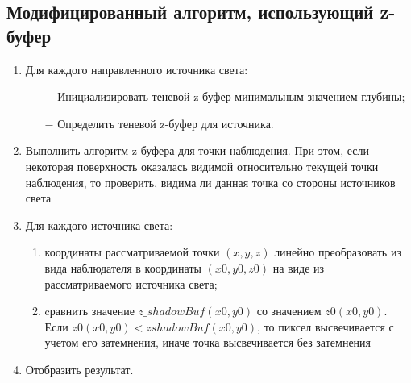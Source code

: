 \subsection{Модифицированный алгоритм, использующий z-буфер}
\begin{enumerate}
    \item Для каждого направленного источника света:
    \begin{enumerate}
        \item[$-$] Инициализировать теневой z-буфер минимальным значением глубины;
        \item[$-$] Определить теневой z-буфер для источника.
    \end{enumerate}
    \item Выполнить алгоритм z-буфера для точки наблюдения. При этом, если
    некоторая поверхность оказалась видимой относительно текущей точки
    наблюдения, то проверить, видима ли данная точка со стороны источников света
    \item Для каждого источника света:
    \begin{enumerate}
        \item координаты рассматриваемой точки \((x, y, z)\) линейно преобразовать из вида наблюдателя в координаты
        \((x0, y0, z0)\) на виде из рассматриваемого источника света;
        \item cравнить значение \(z\_shadowBuf (x0, y0)\) со значением \(z0(x0, y0)\).
        Если \(z0(x0, y0) < zshadowBuf (x0, y0)\), то пиксел высвечивается с учетом его
        затемнения, иначе точка высвечивается без затемнения
    \end{enumerate}
    \item Отобразить результат.
\end{enumerate}

